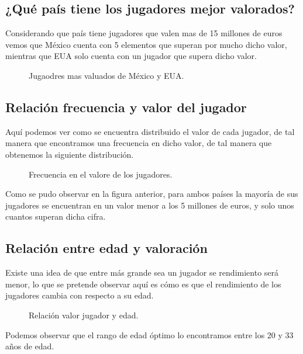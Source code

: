 \documentclass[10pt]{article}
\begin{document}
\begin{center}
    \section*{\textbf{¿Qué país tiene los jugadores mejor valorados?}}
\end{center}
Considerando que país tiene jugadores que valen mas de 15 millones de euros vemos que México cuenta con 5 elementos que superan por mucho dicho valor, mientras que EUA solo cuenta con un jugador que supera dicho valor.
\begin{figure}[H]
    \centering
    \label{fig:my_label}
    \caption{Jugaodres mas valuados de México y EUA.}
\end{figure}
\newpage
\begin{center}
    \section*{\textbf{Relación frecuencia y valor del jugador}}
\end{center}
Aquí podemos ver como se encuentra distribuido el valor de cada jugador, de tal manera que encontramos una frecuencia en dicho valor, de tal manera que obtenemos la siguiente distribución.
\begin{figure}[H]
    \centering
    \label{fig:my_label}
    \caption{Frecuencia en el valore de los  jugadores.}
\end{figure}
Como se pudo observar en la figura anterior, para ambos países la mayoría de sus jugadores se encuentran en un valor menor a los 5 millones de euros, y solo unos cuantos superan dicha cifra. \newline
\begin{center}
    \section*{\textbf{Relación entre edad y valoración}}
\end{center}
Existe una idea de que entre más grande sea un jugador se rendimiento será menor, lo que se pretende observar aquí es cómo es que el rendimiento de los jugadores cambia con respecto a su edad.
\begin{figure}[H]
    \centering
    \label{fig:my_label}
    \caption{Relación valor jugador y edad.}
\end{figure}
Podemos observar que el rango de edad óptimo lo encontramos entre los 20 y 33 años de edad. \newpage
\end{document}
